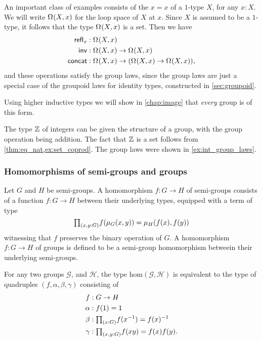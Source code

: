 \begin{eg}
An important class of examples consists of the  $x=x$ of a $1$-type $X$, for any $x:X$. 
We will write $\Omega^{}(X,x)$ for the loop space of $X$ at $x$. 
Since $X$ is assumed to be a $1$-type, it follows that the type $\Omega^{}(X,x)$ is a set. Then we have
\begin{align*}
\mathsf{refl}_{x} & : \Omega^{}(X,x) \\
\mathsf{inv} & : \Omega^{}(X,x) \to \Omega^{}(X,x) \\
\mathsf{concat} & : \Omega^{}(X,x) \to (\Omega^{}(X,x)\to \Omega^{}(X,x)),
\end{align*}
and these operations satisfy the group laws, since the group laws are just a special case of the groupoid laws for identity types, constructed in \cref{sec:groupoid}.

Using higher inductive types we will show in \cref{chap:image} that \emph{every} group is of this form.
\end{eg}

\begin{eg}
The type ${\mathbb{Z}}$ of integers can be given the structure of a group, with the group operation being addition. The fact that ${\mathbb{Z}}$ is a set follows from \cref{thm:eq_nat,ex:set_coprod}. The group laws were shown in \cref{ex:int_group_laws}. 
\end{eg}

\subsubsection{Homomorphisms of semi-groups and groups}

\begin{defn}
  Let $G$ and $H$ be semi-groups. A homomorphism $f:G\to H$ of semi-groups consists of a function $f:G\to H$ between their underlying types, equipped with a term of type
  \begin{equation*}
    \prd{x,y:G} f(\mu_G(x,y))=\mu_H(f(x),f(y))
  \end{equation*}
  witnessing that $f$ preserves the binary operation of $G$. A homomorphism $f:G\to H$ of groups is defined to be a semi-group homomorphism betweein their underlying semi-groups. 
\end{defn}

\begin{lem}
For any two groups $\mathcal{G}$, and $\mathcal{H}$, the type $\mathrm{hom}(\mathcal{G},\mathcal{H})$ is equivalent to the type of quadruples $(f,\alpha,\beta,\gamma)$ consisting of
\begin{align*}
f & : G \to H \\
\alpha & : f(1)=1 \\
\beta & : \prd{x:G}f(x^{-1})=f(x)^{-1} \\
\gamma & : \prd{x,y:G} f(xy)=f(x)f(y).
\end{align*}
\end{lem}

